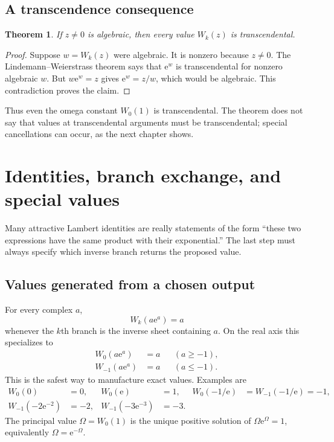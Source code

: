 \documentclass[11pt,oneside]{book}
\newtheorem{theorem}{Theorem}[chapter]
\theoremstyle{definition}
\theoremstyle{remark}
\newcommand{\ee}{\mathrm e}
\begin{document}
\section{A transcendence consequence}

\begin{theorem}\label{thm:transcendence}
If $z\ne0$ is algebraic, then every value $W_k(z)$ is transcendental.
\end{theorem}

\begin{proof}
Suppose $w=W_k(z)$ were algebraic.  It is nonzero because $z\ne0$.
The Lindemann--Weierstrass theorem says that $\ee^w$ is transcendental for
nonzero algebraic $w$.  But $w\ee^w=z$ gives
$\ee^w=z/w$, which would be algebraic.  This contradiction proves the claim.
\end{proof}

Thus even the omega constant $W_0(1)$ is transcendental.  The theorem does not
say that values at transcendental arguments must be transcendental; special
cancellations can occur, as the next chapter shows.


\chapter{Identities, branch exchange, and special values}
\label{ch:identities}

Many attractive Lambert identities are really statements of the form
``these two expressions have the same product with their exponential.''  The
last step must always specify which inverse branch returns the proposed value.

\section{Values generated from a chosen output}

For every complex $a$,
\begin{equation}\label{eq:manufacturedvalue}
 W_k(a\ee^a)=a
\end{equation}
whenever the $k$th branch is the inverse sheet containing $a$.  On the real
axis this specializes to
\begin{align}
 W_0(a\ee^a)&=a &&(a\ge-1),\label{eq:manufacturedw0}\\
 W_{-1}(a\ee^a)&=a &&(a\le-1).\label{eq:manufacturedwm1}
\end{align}
This is the safest way to manufacture exact values.  Examples are
\begin{align*}
 W_0(0)&=0,&
 W_0(\ee)&=1,&
 W_0(-1/\ee)&=W_{-1}(-1/\ee)=-1,\\
 W_{-1}(-2\ee^{-2})&=-2,&
 W_{-1}(-3\ee^{-3})&=-3.&
\end{align*}
The principal value $\Omega=W_0(1)$ is the unique positive solution of
$\Omega\ee^\Omega=1$, equivalently $\Omega=\ee^{-\Omega}$.
\end{document}
